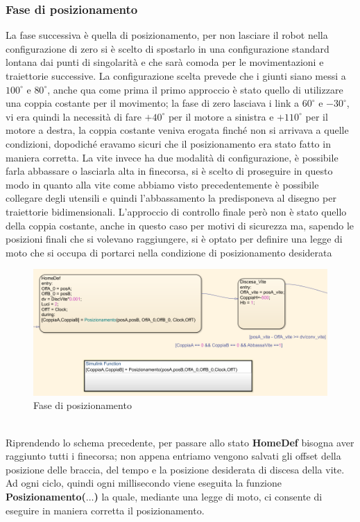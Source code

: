 \subsubsection{Fase di posizionamento}
La fase successiva è quella di posizionamento, per non lasciare il robot nella configurazione di zero si è scelto di spostarlo in una configurazione standard lontana dai punti di singolarità e che sarà comoda per le movimentazioni e traiettorie successive. La configurazione scelta prevede che i giunti siano messi a $100^\circ$ e $80^\circ$, anche qua come prima il primo approccio è stato quello di utilizzare una coppia costante per il movimento; la fase di zero lasciava i link a $60^\circ$ e $-30^\circ$, vi era quindi la necessità di fare $+40^\circ$ per il motore a sinistra e $+110^\circ$ per il motore a destra, la coppia costante veniva erogata finché non si arrivava a quelle condizioni, dopodiché eravamo sicuri che il posizionamento era stato fatto in maniera corretta. La vite invece ha due modalità di configurazione, è possibile farla abbassare o lasciarla alta in finecorsa, si è scelto di proseguire in questo modo in quanto alla vite come abbiamo visto precedentemente è possibile collegare degli utensili e quindi l'abbassamento la predisponeva al disegno per traiettorie bidimensionali. L'approccio di controllo finale però non è stato quello della coppia costante, anche in questo caso per motivi di sicurezza ma, sapendo le posizioni finali che si volevano raggiungere, si è optato per definire una legge di moto che si occupa di portarci nella condizione di posizionamento desiderata
\begin{figure}[ht]
\begin{center}
    \includegraphics[scale=0.7]{Immagini/Sperimentale/state2New.png}
    \caption{Fase di posizionamento}
    \label{fig:Pos}
\end{center}
\end{figure}
\\Riprendendo lo schema precedente, per passare allo stato \textbf{HomeDef} bisogna aver raggiunto tutti i finecorsa; non appena entriamo vengono salvati gli offset della posizione delle braccia, del tempo e la posizione desiderata di discesa della vite. Ad ogni ciclo, quindi ogni millisecondo viene eseguita la funzione \textbf{Posizionamento($\dots$)} la quale, mediante una legge di moto, ci consente di eseguire in maniera corretta il posizionamento.
